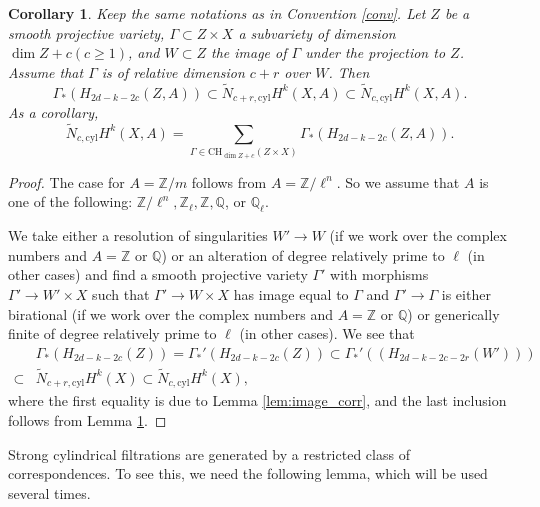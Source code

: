 \documentclass{amsart}
\newtheorem{cor}[theorem]{Corollary}
\theoremstyle{definition}
\theoremstyle{remark}
\newcommand{\mbb}{\mathbb}
\newcommand{\QQ}{\mbb{Q}}
\newcommand{\ZZ}{\mbb{Z}}
\newcommand{\cyl}{\text{cyl}}
\begin{document}
\begin{cor}\label{cor:contain}
    Keep the same notations as in Convention \ref{conv}.
    Let $Z$ be a smooth projective variety, $\Gamma \subset Z \times X$ a subvariety of dimension $\dim Z+c (c\geq 1)$, and $W \subset Z$ the image of $\Gamma$ under the projection to $Z$. Assume that $\Gamma$ is of relative dimension $c+r$ over $W$. Then
    \[
    \Gamma_*(H_{2d-k-2c}(Z, A)) \subset \tilde{N}_{c+r, \cyl}H^k(X, A) \subset \tilde{N}_{c, \cyl}H^k(X, A).
    \]
    As a corollary,
    \[
    \tilde{N}_{c, \cyl}H^k(X, A)=\sum_{\Gamma \in \text{CH}_{\dim Z+c}(Z \times X)}\Gamma_*(H_{2d-k-2c}(Z, A)).
    \]
\end{cor}
\begin{proof}
    The case for $A=\ZZ/m$ follows from $A=\ZZ/\ell^n$. So we assume that $A$ is one of the following: $\ZZ/\ell^n, \ZZ_\ell, \ZZ, \QQ$, or $\QQ_\ell$.
    
    We take either a resolution of singularities $W'\to W$ (if we work over the complex numbers and $A=\ZZ$ or $\QQ$) or an alteration of degree relatively prime to $\ell$ (in other cases) and find a smooth projective variety $\Gamma'$ with morphisms $\Gamma' \to W'\times X$ such that $\Gamma' \to W \times X$ has image equal to $\Gamma$ and $\Gamma' \to \Gamma$ is either birational (if we work over the complex numbers and $A=\ZZ$ or $\QQ$) or generically finite of degree relatively prime to $\ell$ (in other cases). 
    We see that
    \begin{align*}
        &\Gamma_*(H_{2d-k-2c}(Z))=\Gamma_*'(H_{2d-k-2c}(Z))\subset \Gamma_*'((H_{2d-k-2c-2r}(W')))\\
    \subset&\tilde{N}_{c+r, \cyl}H^k(X)\subset\tilde{N}_{c, \cyl}H^k(X),
    \end{align*}
    where the first equality is due to Lemma \ref{lem:image_corr}, and the last inclusion follows from Lemma \ref{cor:contain}.
\end{proof}

Strong cylindrical filtrations are generated by a restricted class of correspondences.
To see this, we need the following lemma, which will be used several times.
\end{document}
